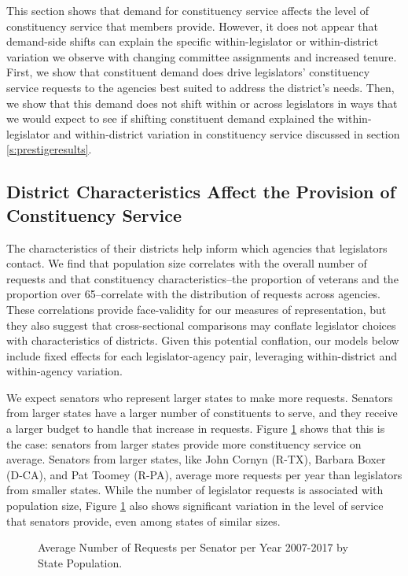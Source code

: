 \documentclass[12pt]{article}
\begin{document}
This section shows that demand for constituency service affects the level of constituency service that members provide. However, it does not appear that demand-side shifts can explain the specific within-legislator or within-district variation we observe with changing committee assignments and increased tenure. First, we show that constituent demand does drive legislators' constituency service requests to the agencies best suited to address the district's needs. Then, we show that this demand does not shift within or across legislators in ways that we would expect to see if shifting constituent demand explained the within-legislator and within-district variation in constituency service discussed in section \ref{s:prestigeresults}.

\subsection{District Characteristics Affect the Provision of Constituency Service }

The characteristics of their districts help inform which agencies that legislators contact. We find that population size correlates with the overall number of requests and that constituency characteristics--the proportion of veterans and the proportion over 65--correlate with the distribution of requests across agencies. These correlations provide face-validity for our measures of representation, but they also suggest that cross-sectional comparisons may conflate legislator choices with characteristics of districts. Given this potential conflation, our models below include fixed effects for each legislator-agency pair, leveraging within-district and within-agency variation.  

We expect senators who represent larger states to make more requests. Senators from larger states have a larger number of constituents to serve, and they receive a larger budget to handle that increase in requests.
Figure \ref{f:stateSize} shows that this is the case: senators from larger states provide more constituency service on average. Senators from larger states, like John Cornyn (R-TX), Barbara Boxer (D-CA), and Pat Toomey (R-PA), average more requests per year than legislators from smaller states. While the number of legislator requests is associated with population size, Figure \ref{f:stateSize} also shows significant variation in the level of service that senators provide, even among states of similar sizes.  

\begin{figure}
\centering
\caption{Average Number of Requests per Senator per Year 2007-2017 by State Population.} \label{f:stateSize}
\end{figure}
\end{document}
